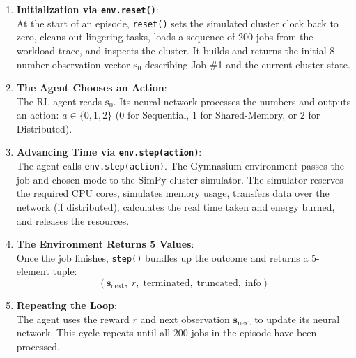 \documentclass[11pt,a4paper]{article}
\begin{document}
\begin{center}
\begin{tcolorbox}[colback=white, colframe=primarynavy, width=0.95\textwidth, arc=2mm, title=The Step-by-Step Gymnasium Feedback Loop]
\begin{enumerate}[noitemsep, topsep=2pt]
    \item \textbf{Initialization via \texttt{env.reset()}}:\\
    At the start of an episode, \texttt{reset()} sets the simulated cluster clock back to zero, cleans out lingering tasks, loads a sequence of 200 jobs from the workload trace, and inspects the cluster. It builds and returns the initial 8-number observation vector $\mathbf{s}_0$ describing Job \#1 and the current cluster state.
    \item \textbf{The Agent Chooses an Action}:\\
    The RL agent reads $\mathbf{s}_0$. Its neural network processes the numbers and outputs an action: $a \in \{0, 1, 2\}$ (0 for Sequential, 1 for Shared-Memory, or 2 for Distributed).
    \item \textbf{Advancing Time via \texttt{env.step(action)}}:\\
    The agent calls \texttt{env.step(action)}. The Gymnasium environment passes the job and chosen mode to the SimPy cluster simulator. The simulator reserves the required CPU cores, simulates memory usage, transfers data over the network (if distributed), calculates the real time taken and energy burned, and releases the resources.
    \item \textbf{The Environment Returns 5 Values}:\\
    Once the job finishes, \texttt{step()} bundles up the outcome and returns a 5-element tuple:
    \begin{equation*}
        (\mathbf{s}_{\text{next}}, \; r, \; \text{terminated}, \; \text{truncated}, \; \text{info})
    \end{equation*}
    \item \textbf{Repeating the Loop}:\\
    The agent uses the reward $r$ and next observation $\mathbf{s}_{\text{next}}$ to update its neural network. This cycle repeats until all 200 jobs in the episode have been processed.
\end{enumerate}
\end{tcolorbox}
\end{center}
\end{document}
